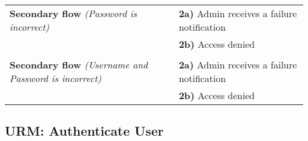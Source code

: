 \documentclass[a4paper,11pt]{article}
\begin{document}
\begin{tabular}{|p{3.5cm}|p{11.5cm}|}
    \textbf{Secondary flow} \emph{(Password is incorrect)} &  
    \textbf{2a)} Admin receives a failure notification \\ &
    \textbf{2b)} Access denied
    
    \\ \hline \rowcolor{Gray} & \\ \hline  
    
    \textbf{Secondary flow} \emph{(Username and Password is incorrect)} &  
    \textbf{2a)} Admin receives a failure notification \\ &
    \textbf{2b)} Access denied
    
    \\ \hline   
\end{tabular}


\subsection{URM: Authenticate User}
\end{document}
